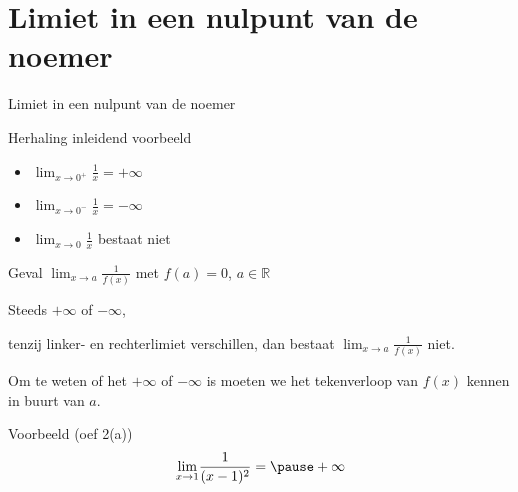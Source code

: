 \documentclass{beamer}
\begin{document}
\section{Limiet in een nulpunt van de noemer}
\begin{frame}{Limiet in een nulpunt van de noemer}
\begin{block}{Herhaling  inleidend voorbeeld}
\begin{itemize}
	\item $\displaystyle{\lim_{x  \to  0^+}} \frac 1x = +
\infty$
\item $\displaystyle{\lim_{x  \to  0^-}} \frac 1x = -
\infty$
\item $\displaystyle{\lim_{x \to  0}} \frac 1x$ bestaat niet
\end{itemize}
\end{block}
\end{frame}
\begin{frame}{Geval $\displaystyle{\lim_{x \rightarrow a}} \frac{1}{f(x)}$
met $f(a) = 0$, $a \in \mathbb{R}$}


Steeds $+ \infty$ of $- \infty$, 

tenzij
linker- en rechterlimiet verschillen, dan bestaat
$\displaystyle{\lim_{x \rightarrow a}} \frac 1{f(x)}$ niet.

Om te weten of het $+ \infty$ of $- \infty$ is moeten we het tekenverloop van
$f(x)$ kennen in buurt van $a$.
\end{frame}

\begin{frame}
\begin{exampleblock}{Voorbeeld (oef 2(a))}
$$\displaystyle{\lim_{x \rightarrow 1}} \frac {1}{(x-1)^2}= \pause + \infty$$
\end{exampleblock}
\end{frame}
\end{document}
